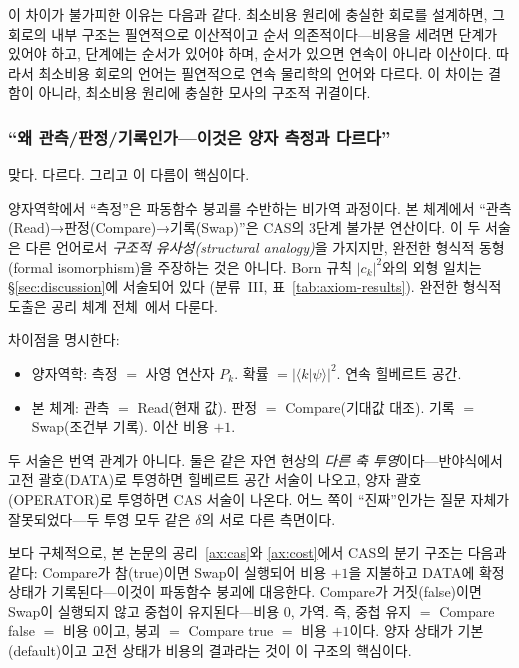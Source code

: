 \documentclass[entropy,article,submit,pdftex,oneauthor]{Definitions/mdpi}
\begin{document}
이 차이가 불가피한 이유는 다음과 같다. 최소비용 원리에 충실한 회로를 설계하면, 그 회로의 내부 구조는 필연적으로 이산적이고 순서 의존적이다---비용을 세려면 단계가 있어야 하고, 단계에는 순서가 있어야 하며, 순서가 있으면 연속이 아니라 이산이다. 따라서 최소비용 회로의 언어는 필연적으로 연속 물리학의 언어와 다르다. 이 차이는 결함이 아니라, 최소비용 원리에 충실한 모사의 구조적 귀결이다.

\subsubsection{``왜 관측/판정/기록인가---이것은 양자 측정과 다르다''}

맞다. 다르다. 그리고 이 다름이 핵심이다.

양자역학에서 ``측정''은 파동함수 붕괴를 수반하는 비가역 과정이다. 본 체계에서 ``관측(Read)→판정(Compare)→기록(Swap)''은 CAS의 3단계 불가분 연산이다. 이 두 서술은 다른 언어로서 \emph{구조적 유사성(structural analogy)}을 가지지만, 완전한 형식적 동형(formal isomorphism)을 주장하는 것은 아니다. Born 규칙 $|c_k|^2$와의 외형 일치는 §\ref{sec:discussion}에 서술되어 있다 (분류~III, 표~\ref{tab:axiom-results}). 완전한 형식적 도출은 공리 체계 전체~\cite{han2026}에서 다룬다.

차이점을 명시한다:
\begin{itemize}
\item 양자역학: 측정 $=$ 사영 연산자 $P_k$. 확률 $= |\langle k|\psi\rangle|^2$. 연속 힐베르트 공간.
\item 본 체계: 관측 $=$ Read(현재 값). 판정 $=$ Compare(기대값 대조). 기록 $=$ Swap(조건부 기록). 이산 비용 $+1$.
\end{itemize}

두 서술은 번역 관계가 아니다. 둘은 같은 자연 현상의 \emph{다른 축 투영}이다---반야식에서 고전 괄호(DATA)로 투영하면 힐베르트 공간 서술이 나오고, 양자 괄호(OPERATOR)로 투영하면 CAS 서술이 나온다. 어느 쪽이 ``진짜''인가는 질문 자체가 잘못되었다---두 투영 모두 같은 $\delta$의 서로 다른 측면이다.

보다 구체적으로, 본 논문의 공리~\ref{ax:cas}와 \ref{ax:cost}에서 CAS의 분기 구조는 다음과 같다: Compare가 참(true)이면 Swap이 실행되어 비용 $+1$을 지불하고 DATA에 확정 상태가 기록된다---이것이 파동함수 붕괴에 대응한다. Compare가 거짓(false)이면 Swap이 실행되지 않고 중첩이 유지된다---비용 $0$, 가역. 즉, 중첩 유지 $=$ Compare false $=$ 비용 $0$이고, 붕괴 $=$ Compare true $=$ 비용 $+1$이다. 양자 상태가 기본(default)이고 고전 상태가 비용의 결과라는 것이 이 구조의 핵심이다.
\end{document}
